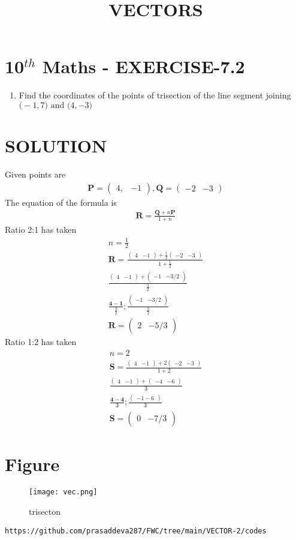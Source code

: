 \documentclass[12pt]{article}
\newcommand{\myvec}[1]{\ensuremath{\begin{pmatrix}#1\end{pmatrix}}}
\let\vec\mathbf
\begin{document}
\begin{center}
\title{\textbf{VECTORS}}
\date{\vspace{-5ex}} %
\maketitle
\end{center}

\section{10$^{th}$ Maths - EXERCISE-7.2}

\begin{enumerate}
\item Find the coordinates of the points of trisection of the line segment joining $\vec(-1, 7) \text{ and } \vec(4, -3)$ 
\end{enumerate}

\section{SOLUTION}
Given points are
\begin{align}
\vec{P}=\myvec{4,& -1} ,
\vec{Q}=\myvec{-2& -3}
\end{align}
The equation of the formula is
\begin{align}
\vec{R}=\frac{\vec{Q}+n\vec{P}}{1+n}
\end{align}
Ratio 2:1 has taken 
\begin{align}
n=\frac{1}{2}\\
\vec{R}=\frac{\myvec{4&-1}+\frac{1}{2}\myvec{-2&-3}}{1+\frac{1}{2}} \\
\frac{\myvec{4&-1}+\myvec{-1&-3/2}}{\frac{3}{2}}\\
\frac{\vec{4-1}}{\frac{3}{2}};\frac{\myvec{-1& -3/2}}{\frac{3}{2}}\\
\vec{R}=\myvec{2 & -5/3}
\end{align}
Ratio 1:2 has taken
\begin{align}
n=2\\
\vec{S}=\frac{\myvec{4& -1}+2\myvec{-2& -3}}{1+2} \\
\frac{\myvec{4& -1}+\myvec{-4& -6}}{3}\\
\frac{\vec{4-4}}{3};\frac{\myvec{-1-6}}{3}\\
\vec{S}=\myvec{0& -7/3}
\end{align}

\section{Figure}
\begin{figure}[h]
\centering
\texttt{[image: vec.png]}
\caption{trisecton}
		\label{fig:Figure}
\end{figure}
\begin{lstlisting}
https://github.com/prasaddeva287/FWC/tree/main/VECTOR-2/codes
\end{lstlisting}
\end{document}
